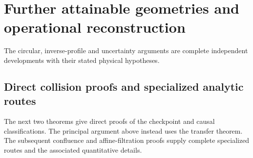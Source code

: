 \documentclass[11pt]{amsart}
\theoremstyle{definition}\newtheorem{definition}[theorem]{Definition}
\theoremstyle{remark}\newtheorem{remark}[theorem]{Remark}
\begin{document}
\section{Further attainable geometries and operational reconstruction}
\label{app:additional-geometry}
The circular, inverse-profile and uncertainty arguments are complete
independent developments with their stated physical hypotheses.
\begingroup
\let\section\subsection
\let\subsection\subsubsection
\let\subsubsection\paragraph




\endgroup
\section{Direct collision proofs and specialized analytic routes}
\label{app:complete-routes}
The next two theorems give direct proofs of the checkpoint and causal
classifications. The principal argument above instead uses the transfer
theorem. The subsequent confluence and affine-filtration proofs supply
complete specialized routes and the associated quantitative details.

\begingroup
\let\section\subsection
\let\subsection\subsubsection
\let\subsubsection\paragraph



\endgroup
\end{document}
